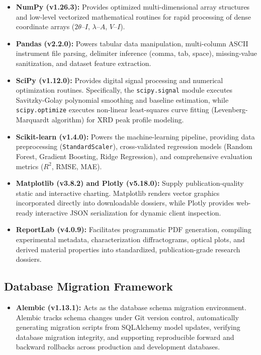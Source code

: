 \documentclass[12pt,a4paper,oneside]{report}
\begin{document}
{{{\begin{itemize}
    \item \textbf{NumPy (v1.26.3):} Provides optimized multi-dimensional array structures and low-level vectorized mathematical routines for rapid processing of dense coordinate arrays ($2\theta\text{--}I$, $\lambda\text{--}A$, $V\text{--}I$).
    \item \textbf{Pandas (v2.2.0):} Powers tabular data manipulation, multi-column ASCII instrument file parsing, delimiter inference (comma, tab, space), missing-value sanitization, and dataset feature extraction.
    \item \textbf{SciPy (v1.12.0):} Provides digital signal processing and numerical optimization routines. Specifically, the \texttt{scipy.signal} module executes Savitzky-Golay polynomial smoothing and baseline estimation, while \texttt{scipy.optimize} executes non-linear least-squares curve fitting (Levenberg-Marquardt algorithm) for XRD peak profile modeling.
    \item \textbf{Scikit-learn (v1.4.0):} Powers the machine-learning pipeline, providing data preprocessing (\texttt{StandardScaler}), cross-validated regression models (Random Forest, Gradient Boosting, Ridge Regression), and comprehensive evaluation metrics ($R^2$, RMSE, MAE).
    \item \textbf{Matplotlib (v3.8.2) and Plotly (v5.18.0):} Supply publication-quality static and interactive charting. Matplotlib renders vector graphics incorporated directly into downloadable dossiers, while Plotly provides web-ready interactive JSON serialization for dynamic client inspection.
    \item \textbf{ReportLab (v4.0.9):} Facilitates programmatic PDF generation, compiling experimental metadata, characterization diffractograms, optical plots, and derived material properties into standardized, publication-grade research dossiers.
\end{itemize}

\subsection{Database Migration Framework}

\begin{itemize}
    \item \textbf{Alembic (v1.13.1):} Acts as the database schema migration environment. Alembic tracks schema changes under Git version control, automatically generating migration scripts from SQLAlchemy model updates, verifying database migration integrity, and supporting reproducible forward and backward rollbacks across production and development databases.
\end{itemize}

}}}
\end{document}
